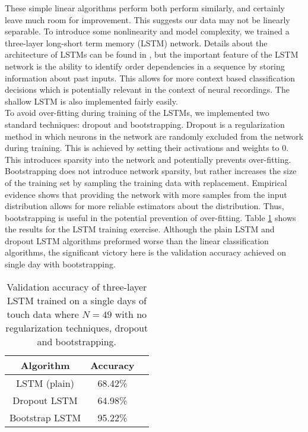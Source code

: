 \documentclass[12pt]{article}
\begin{document}
These simple linear algorithms perform both perform similarly, and certainly leave much room for improvement. This suggests our data may not be linearly separable. To introduce some nonlinearity and model complexity, we trained a three-layer long-short term memory (LSTM) network. Details about the architecture of LSTMs can be found in \cite{bengio}, but the important feature of the LSTM network is the ability to identify order dependencies in a sequence by storing information about past inputs. This allows for more context based classification decisions which is potentially relevant in the context of neural recordings. The shallow LSTM is also implemented fairly easily. \\
\indent To avoid over-fitting during training of the LSTMs, we implemented two standard techniques: dropout and bootstrapping. Dropout is a regularization method in which neurons in the network are randomly excluded from the network during training. This is achieved by setting their activations and weights to 0. This introduces sparsity into the network and potentially prevents over-fitting. Bootstrapping does not introduce network sparsity, but rather increases the size of the training set by sampling the training data with replacement. Empirical evidence shows that providing the network with more samples from the input distribution allows for more reliable estimators about the distribution. Thus, bootstrapping is useful in the potential prevention of over-fitting. Table \ref{tab:LSTM} shows the results for the LSTM training exercise. Although the plain LSTM and dropout LSTM algorithms preformed worse than the linear classification algorithms, the significant victory here is the validation accuracy achieved on single day with bootstrapping.

\begin{table}[]
  \centering
\begin{tabular}{|c|c|c|}
  \hline
                Algorithm    & Accuracy   \\
                      \hline
LSTM (plain) & 68.42\%   \\
  \hline
Dropout LSTM                 & 64.98\%     \\
  \hline
Bootstrap LSTM                 & 95.22\%     \\
\hline
\end{tabular}
\caption{Validation accuracy of three-layer LSTM trained on a single days of touch data where $N = 49$ with no regularization techniques, dropout and bootstrapping.}
\label{tab:LSTM}
\end{table}
\end{document}

